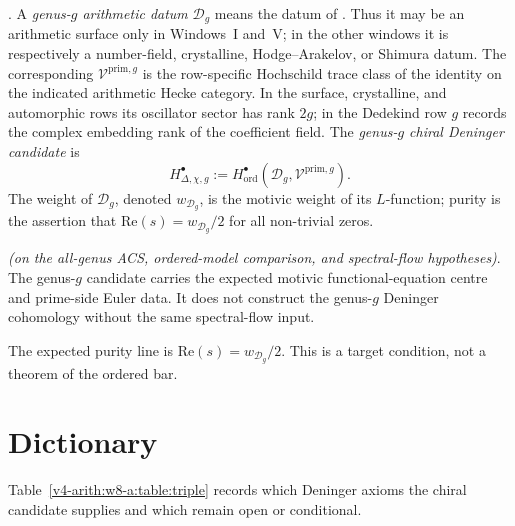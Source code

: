 \begin{definition}
\label{v4-arith:w8-a:def:deninger-g}
\ClaimStatusDefinitional. A \emph{genus-\(g\) arithmetic datum}
\(\mathcal{D}_g\) means the datum of
. Thus it may be an arithmetic surface
only in Windows~I and~V; in the other windows it is respectively a
number-field, crystalline, Hodge--Arakelov, or Shimura datum. The
corresponding \(\mathcal{V}^{\mathrm{prim},g}\) is the row-specific
Hochschild trace class of the identity on the indicated arithmetic
Hecke category. In the surface, crystalline, and automorphic rows its
oscillator sector has rank \(2g\); in the Dedekind row \(g\) records
the complex embedding rank of the coefficient field. The
\emph{genus-\(g\) chiral Deninger candidate} is
\begin{equation}
\label{v4-arith:w8-a:eq:deninger-g-def}
H^\bullet_{\Delta,\chi,g}
:=
H^\bullet_{\mathrm{ord}}
(\mathcal D_g,\mathcal V^{\mathrm{prim},g}).
\end{equation}
The weight of \(\mathcal{D}_g\), denoted \(w_{\mathcal{D}_g}\), is the
motivic weight of its \(L\)-function; purity is the assertion that
\(\mathrm{Re}(s)=w_{\mathcal{D}_g}/2\) for all non-trivial zeros.
\end{definition}

\begin{theorem}
\label{v4-arith:w8-a:thm:all-genus-deninger}
\ClaimStatusConditional \emph{(on the all-genus ACS, ordered-model
comparison, and spectral-flow hypotheses)}. The genus-\(g\) candidate
carries the expected motivic functional-equation centre and prime-side
Euler data. It does not construct the genus-\(g\) Deninger cohomology
without the same spectral-flow input.
\end{theorem}

\begin{remark}
\label{v4-arith:w8-a:rem:weight-g}
The expected purity line is
\(\mathrm{Re}(s)=w_{\mathcal D_g}/2\). This is a target condition, not
a theorem of the ordered bar.
\end{remark}

\section{Dictionary}
\label{v4-arith:w8-a:dictionary}

Table~\ref{v4-arith:w8-a:table:triple} records which Deninger axioms
the chiral candidate supplies and which remain open or conditional.

